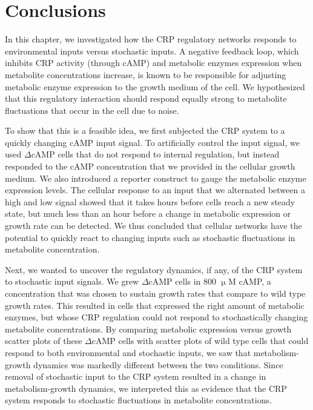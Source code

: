 







\section*{Conclusions}

In this chapter, 
we investigated how the CRP regulatory networks responds to environmental inputs versus stochastic inputs.
%
A negative feedback loop, which inhibits CRP activity (through cAMP) and metabolic enzymes expression when metabolite concentrations increase,
is known to be responsible for adjusting metabolic enzyme expression to the growth medium of the cell.
%
We hypothesized that this regulatory interaction should respond equally strong to metabolite fluctuations that occur in the cell due to noise. 

To show that this is a feasible idea, we first subjected the CRP system to a quickly changing cAMP input signal.
To artificially control the input signal, we used $\Delta$cAMP cells that do not respond to internal regulation, but instead responded to the cAMP concentration that we provided in the cellular growth medium.
We also introduced a reporter construct to gauge the metabolic enzyme expression levels.
%
The cellular response to an input that we alternated between a high and low signal showed that 
it takes hours before cells reach a new steady state, but much less than an hour before a change in metabolic expression or growth rate can be detected.
%
We thus concluded that cellular networks have the potential to quickly react to changing inputs such as stochastic fluctuations in metabolite concentration.

Next, we wanted to 
uncover
the regulatory dynamics, if any, of the CRP system to stochastic input signals.
%
We grew  $\Delta$cAMP cells in 800 $\upmu$M cAMP,
a concentration that was chosen to sustain growth rates that compare to wild type growth rates.
%
This resulted in cells that expressed the right amount of metabolic enzymes, 
but whose CRP regulation could not respond to stochastically changing metabolite concentrations.
%
By comparing metabolic expression versus growth scatter plots of these $\Delta$cAMP cells with
scatter plots of wild type cells that could respond to both environmental and stochastic inputs, 
we saw that metabolism-growth dynamics was markedly different between the two conditions.
%
Since removal of stochastic input to the CRP system resulted in a change in metabolism-growth dynamics, 
we interpreted this as evidence that the CRP system responds to stochastic fluctuations in metabolite concentrations.

